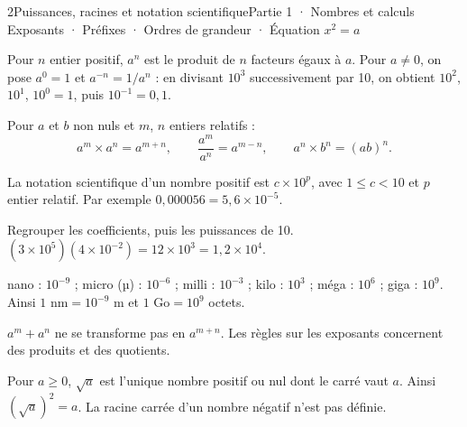 \begin{ouverture}[courbe]{2}{Puissances, racines et notation scientifique}{Partie 1 · Nombres et calculs}
{Exposants · Préfixes · Ordres de grandeur · Équation $x^2=a$}
\end{ouverture}
\pagestyle{otMain}\essentiel\fontsize{11}{15}\selectfont
{}
\begin{definition}Pour $n$ entier positif, $a^n$ est le produit de $n$ facteurs égaux à $a$. Pour $a\ne0$, on pose $a^0=1$ et $a^{-n}=1/a^n$ : en divisant $10^3$ successivement par 10, on obtient $10^2$, $10^1$, $10^0=1$, puis $10^{-1}=0{,}1$.\end{definition}
\begin{propriete}Pour $a$ et $b$ non nuls et $m$, $n$ entiers relatifs :
\[a^m\times a^n=a^{m+n},\qquad \frac{a^m}{a^n}=a^{m-n},\qquad a^n\times b^n=(ab)^n.\]\end{propriete}
\begin{definition}La notation scientifique d’un nombre positif est $c\times10^p$, avec $1\le c<10$ et $p$ entier relatif. Par exemple $0{,}000056=5{,}6\times10^{-5}$.\end{definition}
\begin{savoirfaire}Regrouper les coefficients, puis les puissances de 10. $(3\times10^5)(4\times10^{-2})=12\times10^3=1{,}2\times10^4$.\end{savoirfaire}
\begin{propriete}[Préfixes]nano : $10^{-9}$ ; micro (µ) : $10^{-6}$ ; milli : $10^{-3}$ ; kilo : $10^{3}$ ; méga : $10^{6}$ ; giga : $10^{9}$. Ainsi $1\text{ nm}=10^{-9}\text{ m}$ et $1\text{ Go}=10^9$ octets.\end{propriete}
\begin{attention}$a^m+a^n$ ne se transforme pas en $a^{m+n}$. Les règles sur les exposants concernent des produits et des quotients.\end{attention}
\clearpage
{}
\begin{definition}Pour $a\ge0$, $\sqrt a$ est l’unique nombre positif ou nul dont le carré vaut $a$. Ainsi $(\sqrt a)^2=a$. La racine carrée d’un nombre négatif n’est pas définie.\end{definition}
